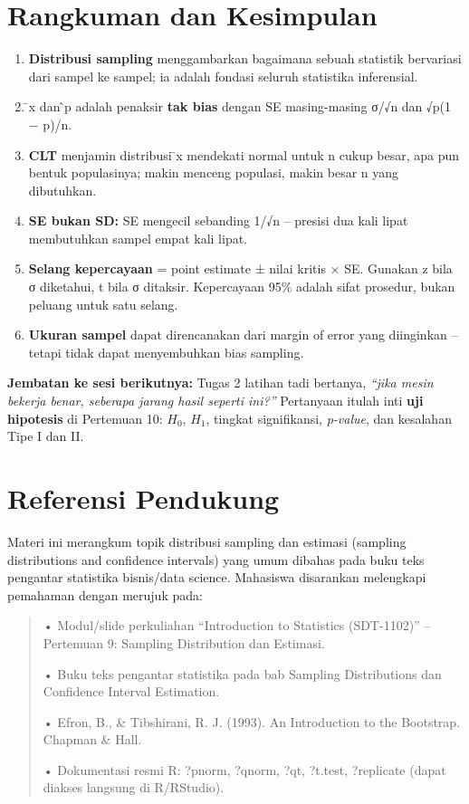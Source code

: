 \documentclass[
  indonesian,
  letterpaper,
]{book}
\begin{document}
\section{Rangkuman dan Kesimpulan}\label{rangkuman-dan-kesimpulan}

\begin{enumerate}
\def\labelenumi{\arabic{enumi}.}
\item
  \textbf{Distribusi sampling} menggambarkan bagaimana sebuah statistik
  bervariasi dari sampel ke sampel; ia adalah fondasi seluruh statistika
  inferensial.
\item
  ̄x dan ̂p adalah penaksir \textbf{tak bias} dengan SE masing-masing
  σ/√n dan √p(1 − p)/n.
\item
  \textbf{CLT} menjamin distribusi ̄x mendekati normal untuk n cukup
  besar, apa pun bentuk populasinya; makin menceng populasi, makin besar
  n yang dibutuhkan.
\item
  \textbf{SE bukan SD:} SE mengecil sebanding 1/√n -- presisi dua kali
  lipat membutuhkan sampel empat kali lipat.
\item
  \textbf{Selang kepercayaan} = point estimate ± nilai kritis × SE.
  Gunakan z bila σ diketahui, t bila σ ditaksir. Kepercayaan 95\% adalah
  sifat prosedur, bukan peluang untuk satu selang.
\item
  \textbf{Ukuran sampel} dapat direncanakan dari margin of error yang
  diinginkan -- tetapi tidak dapat menyembuhkan bias sampling.
\end{enumerate}

\textbf{Jembatan ke sesi berikutnya:} Tugas 2 latihan tadi bertanya,
\emph{``jika mesin bekerja benar, seberapa jarang hasil seperti ini?''}
Pertanyaan itulah inti \textbf{uji hipotesis} di Pertemuan 10: \(H_0\),
\(H_1\), tingkat signifikansi, \emph{p-value}, dan kesalahan Tipe I dan
II.

\section{Referensi Pendukung}\label{referensi-pendukung}

Materi ini merangkum topik distribusi sampling dan estimasi (sampling
distributions and confidence intervals) yang umum dibahas pada buku teks
pengantar statistika bisnis/data science. Mahasiswa disarankan
melengkapi pemahaman dengan merujuk pada:

\begin{quote}
• Modul/slide perkuliahan ``Introduction to Statistics (SDT-1102)'' --
Pertemuan 9: Sampling Distribution dan Estimasi.

• Buku teks pengantar statistika pada bab Sampling Distributions dan
Confidence Interval Estimation.

• Efron, B., \& Tibshirani, R. J. (1993). An Introduction to the
Bootstrap. Chapman \& Hall.

• Dokumentasi resmi R: ?pnorm, ?qnorm, ?qt, ?t.test, ?replicate (dapat
diakses langsung di R/RStudio).
\end{quote}
\end{document}
